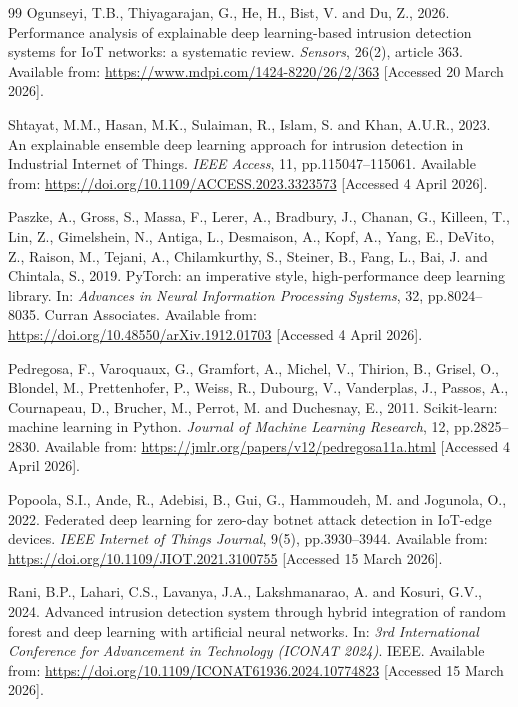 \documentclass[12pt,a4paper]{report}
\begin{document}
\begin{thebibliography}{99}
Ogunseyi, T.B., Thiyagarajan, G., He, H., Bist, V. and Du, Z., 2026. Performance analysis of explainable deep learning-based intrusion detection systems for IoT networks: a systematic review. \textit{Sensors}, 26(2), article 363. Available from: \url{https://www.mdpi.com/1424-8220/26/2/363} [Accessed 20 March 2026].

Shtayat, M.M., Hasan, M.K., Sulaiman, R., Islam, S. and Khan, A.U.R., 2023. An explainable ensemble deep learning approach for intrusion detection in Industrial Internet of Things. \textit{IEEE Access}, 11, pp.115047--115061. Available from: \url{https://doi.org/10.1109/ACCESS.2023.3323573} [Accessed 4 April 2026].


Paszke, A., Gross, S., Massa, F., Lerer, A., Bradbury, J., Chanan, G., Killeen, T., Lin, Z., Gimelshein, N., Antiga, L., Desmaison, A., Kopf, A., Yang, E., DeVito, Z., Raison, M., Tejani, A., Chilamkurthy, S., Steiner, B., Fang, L., Bai, J. and Chintala, S., 2019. PyTorch: an imperative style, high-performance deep learning library. In: \textit{Advances in Neural Information Processing Systems}, 32, pp.8024--8035. Curran Associates. Available from: \url{https://doi.org/10.48550/arXiv.1912.01703} [Accessed 4 April 2026].

Pedregosa, F., Varoquaux, G., Gramfort, A., Michel, V., Thirion, B., Grisel, O., Blondel, M., Prettenhofer, P., Weiss, R., Dubourg, V., Vanderplas, J., Passos, A., Cournapeau, D., Brucher, M., Perrot, M. and Duchesnay, E., 2011. Scikit-learn: machine learning in Python. \textit{Journal of Machine Learning Research}, 12, pp.2825--2830. Available from: \url{https://jmlr.org/papers/v12/pedregosa11a.html} [Accessed 4 April 2026].

Popoola, S.I., Ande, R., Adebisi, B., Gui, G., Hammoudeh, M. and Jogunola, O., 2022. Federated deep learning for zero-day botnet attack detection in IoT-edge devices. \textit{IEEE Internet of Things Journal}, 9(5), pp.3930--3944. Available from: \url{https://doi.org/10.1109/JIOT.2021.3100755} [Accessed 15 March 2026].

Rani, B.P., Lahari, C.S., Lavanya, J.A., Lakshmanarao, A. and Kosuri, G.V., 2024. Advanced intrusion detection system through hybrid integration of random forest and deep learning with artificial neural networks. In: \textit{3rd International Conference for Advancement in Technology (ICONAT 2024)}. IEEE. Available from: \url{https://doi.org/10.1109/ICONAT61936.2024.10774823} [Accessed 15 March 2026].


\end{thebibliography}
\end{document}
